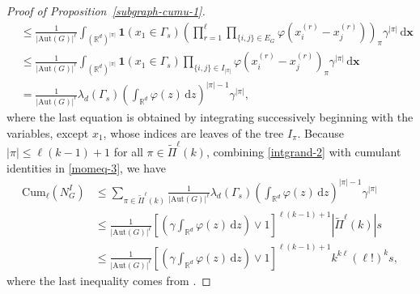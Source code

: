 \documentclass{article}
\theoremstyle{definition}
\numberwithin{equation}{section}
\theoremstyle{remark}
\newcommand{\cum}{\mathrm{Cum}}
\begin{document}
\begin{proof}[Proof of Proposition~\ref{subgraph-cumu-1}]
\begin{align}
	&\le\frac1{|\mathrm{Aut}(G)|^\ell}\int_{(\mathbb{R}^d)^{|\pi|}}\mathbf{1}(x_1\in\Gamma_s)\left(\prod_{r=1}^\ell\prod_{\{i,j\}\in E_G}\varphi\left(x_i^{(r)}-x_j^{(r)}\right)\right)_{\pi}\gamma^{|\pi|}\,\mathrm{d}\bm{x}\nonumber\\
	&\le\frac1{|\mathrm{Aut}(G)|^\ell}\int_{(\mathbb{R}^d)^{|\pi|}}\mathbf{1}(x_1\in\Gamma_s)\prod_{\{i,j\}\in I_{|\pi|}}\varphi\left(x_i^{(r)}-x_j^{(r)}\right)_{\pi}\gamma^{|\pi|}\,\mathrm{d}\bm{x}\nonumber\\
&=\frac{1}{|\mathrm{Aut}(G)|^\ell}\lambda_d(\Gamma_s)\left(\int_{\mathbb{R}^d}\varphi(z)\,\mathrm{d}z\right)^{|\pi|-1}\gamma^{|\pi|},\label{intgrand-2}
\end{align}
where the last equation is obtained by integrating successively beginning with the variables, except $x_1$, whose indices are leaves of the tree $I_{\pi}$.
Because $|\pi|\le \ell(k-1)+1$ for all $\pi\in\widetilde{\Pi}^\ell(k)$, combining \eqref{intgrand-2} with cumulant identities in \eqref{momeq-3}, we have 
\begin{align}
    	\cum_\ell(N_G^{I})&\le \sum_{\pi\in\widetilde{\Pi}^\ell(k)}\frac{1}{|\mathrm{Aut}(G)|^\ell}\lambda_d(\Gamma_s)\left(\int_{\mathbb{R}^d}\varphi(z)\,\mathrm{d}z\right)^{|\pi|-1}\gamma^{|\pi|}\nonumber\\
        &\le \frac{1}{|\mathrm{Aut}(G)|^\ell}\left[\left(\gamma \int_{\mathbb{R}^d}\varphi(z)\,\mathrm{d}z\right)\vee1\right]^{\ell(k-1)+1}\left|\widetilde{\Pi}^\ell(k)\right|s\nonumber\\
        &\le \frac{1}{|\mathrm{Aut}(G)|^\ell}\left[\left(\gamma \int_{\mathbb{R}^d}\varphi(z)\,\mathrm{d}z\right)\vee1\right]^{\ell(k-1)+1}k^{k\ell}(\ell!)^ks,
\end{align}
where the last inequality comes from \cite[Proposition~6.1]{schulte2}. 
\end{proof}
\end{document}
